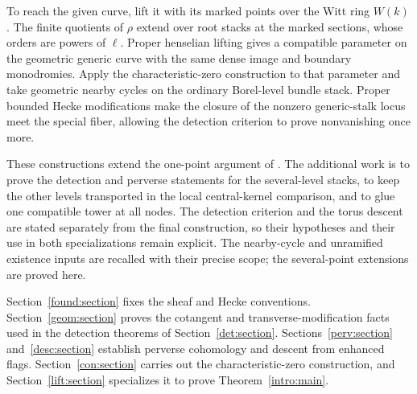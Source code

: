 To reach the given curve, lift it with its marked points over the Witt ring $W(k)$. The finite quotients of $\rho$ extend over root stacks at the marked sections, whose orders are powers of $\ell$. Proper henselian lifting gives a compatible parameter on the geometric generic curve with the same dense image and boundary monodromies. Apply the characteristic-zero construction to that parameter and take geometric nearby cycles on the ordinary Borel-level bundle stack. Proper bounded Hecke modifications make the closure of the nonzero generic-stalk locus meet the special fiber, allowing the detection criterion to prove nonvanishing once more.

These constructions extend the one-point argument of \cite{CT}. The additional work is to prove the detection and perverse statements for the several-level stacks, to keep the other levels transported in the local central-kernel comparison, and to glue one compatible tower at all nodes. The detection criterion and the torus descent are stated separately from the final construction, so their hypotheses and their use in both specializations remain explicit. The nearby-cycle and unramified existence inputs are recalled with their precise scope; the several-point extensions are proved here.

Section~\ref{found:section} fixes the sheaf and Hecke conventions. Section~\ref{geom:section} proves the cotangent and transverse-modification facts used in the detection theorems of Section~\ref{det:section}. Sections~\ref{perv:section} and~\ref{desc:section} establish perverse cohomology and descent from enhanced flags. Section~\ref{con:section} carries out the characteristic-zero construction, and Section~\ref{lift:section} specializes it to prove Theorem~\ref{intro:main}.
